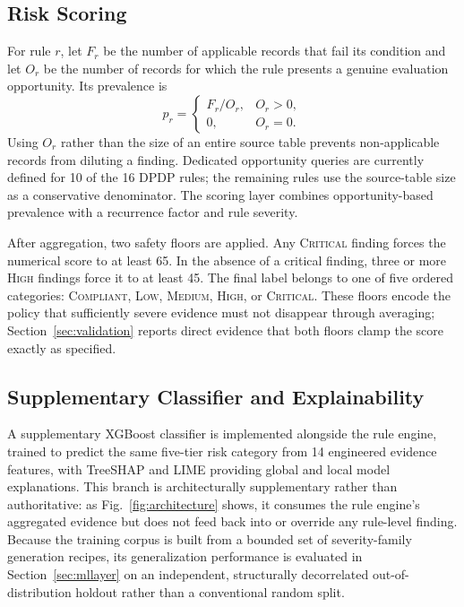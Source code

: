 \documentclass[11pt,a4paper]{article}
\begin{document}
\subsection{Risk Scoring}
For rule $r$, let $F_r$ be the number of applicable records that fail its condition and let $O_r$ be the number of records for which the rule presents a genuine evaluation opportunity. Its prevalence is
\begin{equation}
    p_r = \begin{cases}
        F_r/O_r, & O_r>0,\\
        0, & O_r=0.
    \end{cases}
\end{equation}
Using $O_r$ rather than the size of an entire source table prevents non-applicable records from diluting a finding. Dedicated opportunity queries are currently defined for 10 of the 16 DPDP rules; the remaining rules use the source-table size as a conservative denominator. The scoring layer combines opportunity-based prevalence with a recurrence factor and rule severity.

After aggregation, two safety floors are applied. Any \textsc{Critical} finding forces the numerical score to at least 65. In the absence of a critical finding, three or more \textsc{High} findings force it to at least 45. The final label belongs to one of five ordered categories: \textsc{Compliant}, \textsc{Low}, \textsc{Medium}, \textsc{High}, or \textsc{Critical}. These floors encode the policy that sufficiently severe evidence must not disappear through averaging; Section~\ref{sec:validation} reports direct evidence that both floors clamp the score exactly as specified.

\subsection{Supplementary Classifier and Explainability}
\label{sec:classifier}
A supplementary XGBoost classifier is implemented alongside the rule engine, trained to predict the same five-tier risk category from 14 engineered evidence features, with TreeSHAP and LIME providing global and local model explanations. This branch is architecturally supplementary rather than authoritative: as Fig.~\ref{fig:architecture} shows, it consumes the rule engine's aggregated evidence but does not feed back into or override any rule-level finding. Because the training corpus is built from a bounded set of severity-family generation recipes, its generalization performance is evaluated in Section~\ref{sec:mllayer} on an independent, structurally decorrelated out-of-distribution holdout rather than a conventional random split.
\end{document}
